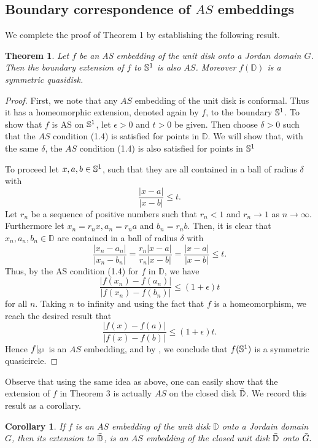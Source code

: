 \documentclass[11pt]{amsart}
\numberwithin{equation}{section}
\theoremstyle{plain}
\newtheorem{thm}{Theorem}
\newtheorem{cor}{Corollary}
\theoremstyle{step}
\def\leq{\leqslant}
\newcommand{\abs}[1]{\lvert#1\rvert}
\newcommand{\Ss}{\Bbb{S}^1}
\newcommand{\D}{\mathbb{D}}
\newcommand{\Dc}{\Bar{\Bbb{D}}}
\begin{document}
\subsection{Boundary correspondence of $AS$ embeddings}
We complete the proof of Theorem 1 by establishing the following result.
\begin{thm}
    Let $f$ be an AS embedding of the unit disk onto a Jordan domain $G$. Then the boundary extension of $f$ to $\Ss$ is also $AS$. Moreover $f(\D)$ is a symmetric quasidisk.
\end{thm}
\begin{proof}
    First, we note that any $AS$ embedding of the unit disk is conformal. Thus it has a homeomorphic extension, denoted again by $f$, to the boundary $\Ss$. To show that $f$ is AS on $\Ss$, let $\epsilon>0$ and $t>0$ be given. Then choose $\delta>0$ such that the $AS$ condition (1.4) is satisfied for points in $\D$. We will show that, with the same $\delta$, the $AS$ condition (1.4) is also satisfied for points in $\Ss$  \par
    To proceed let $x,a,b\in\Ss$, such that they are all contained in a ball of radius $\delta$ with
    \[\frac{\abs{x-a}}{\abs{x-b}}\leq t.\]
    Let $r_n$ be a sequence of positive numbers such that $r_n<1$ and $r_n\to 1$ as $n\to \infty$. Furthermore let $x_n=r_nx, a_n=r_na$ and $b_n=r_nb$. Then, it is clear that $x_n,a_n,b_n\in\D$ are  contained in a ball of radius $\delta$ with
    \[
    \frac{\abs{x_n-a_n}}{\abs{x_n-b_n}}=\frac{r_n\abs{x-a}}{r_n\abs{x-b}}=\frac{\abs{x-a}}{\abs{x-b}}\leq t.
    \]
    Thus, by the AS condition (1.4) for $f$ in $\D$, we have 
    \[
    \frac{\abs{f(x_n)-f(a_n)}}{\abs{f(x_n)-f(b_n)}}\leq (1+\epsilon)t
    \]
    for all $n$. Taking $n$ to infinity and using the fact that $f$ is a homeomorphism, we reach the desired result that 
    \[
    \frac{\abs{f(x)-f(a)}}{\abs{f(x)-f(b)}}\leq (1+\epsilon)t.
    \]
    Hence $f|_{\Ss}$ is an $AS$ embedding, and by \cite[Theorem 3.2]{brania2004asymptotically}, we conclude that $f(\Ss)$ is a symmetric quasicircle. 
\end{proof}
Observe that using the same idea as above, one can easily show that the extension of $f$ in Theorem 3 is actually $AS$ on the closed disk $\Dc$. We record this result as a corollary.
\begin{cor}
    If $f$ is an $AS$ embedding of the unit disk $\D$ onto a Jordain domain $G$, then its extension to $\Dc$, is an $AS$ embedding of the closed unit disk $\Dc$ onto $\Bar{G}.$
\end{cor}
\end{document}
